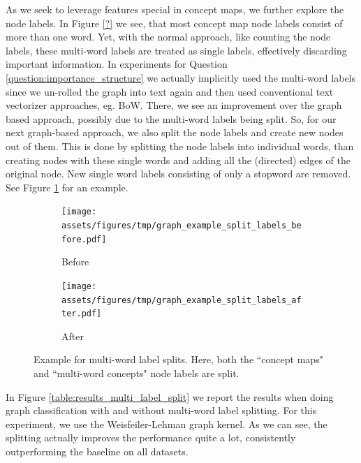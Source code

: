 As we seek to leverage features special in concept maps, we further explore the node labels.
In Figure \ref{?} we see, that most concept map node labels consist of more than one word.
Yet, with the normal approach, like counting the node labels, these multi-word labels are treated as single labels, effectively discarding important information.
In experiments for Question \ref{question:importance_structure} we actually implicitly used the multi-word labels since we un-rolled the graph into text again and then used conventional text vectorizer approaches, eg. BoW.
There, we see an improvement over the graph based approach, possibly due to the multi-word labels being split.
So, for our next graph-based approach, we also split the node labels and create new nodes out of them.
This is done by splitting the node labels into individual words, than creating nodes with these single words and adding all the (directed) edges of the original node.
New single word labels consisting of only a stopword are removed.
See Figure \ref{fig:example_split_labels} for an example.

\begin{figure}[htb!]
	\centering
	\begin{subfigure}[t]{.4\linewidth}	{\texttt{[image: assets/figures/tmp/graph\_example\_split\_labels\_before.pdf]}}
		\caption{Before}
	\end{subfigure}
\hspace{2cm}
	\begin{subfigure}[t]{.4\linewidth}	{\texttt{[image: assets/figures/tmp/graph\_example\_split\_labels\_after.pdf]}}
		\caption{After}
	\end{subfigure}
	\caption[Example: Multi-word node labels Splitting]{Example for multi-word label splits. Here, both the ``concept maps" and ``multi-word concepts" node labels are  split.}\label{fig:example_split_labels}
\end{figure}


In Figure \ref{table:results_multi_label_split} we report the results when doing graph classification with and without multi-word label splitting.
For this experiment, we use the Weisfeiler-Lehman graph kernel.
As we can see, the splitting actually improves the performance quite a lot, consistently outperforming the baseline on all datasets.

